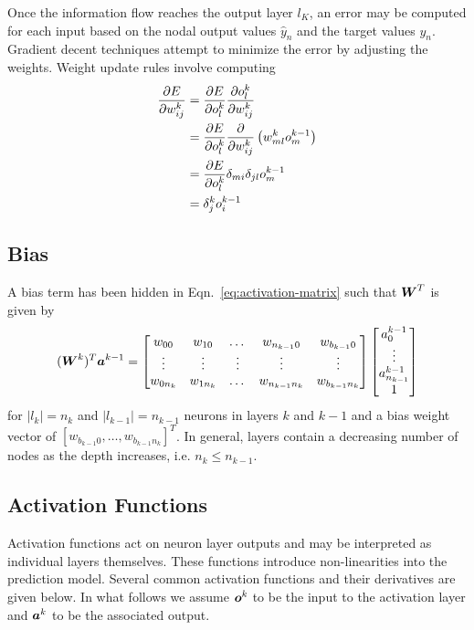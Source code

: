 \documentclass[12pt,notitlepage]{article}
\begin{document}
Once the information flow reaches the output layer $l_{K}$, an error
may be computed for each input based on the nodal output values
$\hat{y}_{n}$ and the target values $y_{n}$.  Gradient decent
techniques attempt to minimize the error by adjusting the weights.
Weight update rules involve computing
\begin{equation}
  \label{eq:error-grad}
  \begin{split}
    \frac{\partial E}{\partial w^{k}_{ij}} &=
    \frac{\partial E}{\partial o_{l}^{k}}\frac{\partial o_{l}^{k}}{\partial w_{ij}^{k}}\\
    &= \frac{\partial E}{\partial o_{l}^{k}} \frac{\partial }{\partial w_{ij}^{k}}\left( w_{ml}^{k}o^{k-1}_{m} \right)\\
    &= \frac{\partial E}{\partial o_{l}^{k}}\delta_{mi}\delta_{jl}o_{m}^{k-1}\\
    &= \delta_{j}^{k}o_{i}^{k-1}
  \end{split}
\end{equation}

\subsection{Bias}
\label{sec:bias}
A bias term has been hidden in Eqn.~\ref{eq:activation-matrix} such
that $\boldsymbol{W}^{T}$ is given by
\begin{equation}
  \label{eq:wmat-explicit}
  (\boldsymbol{W}^{k})^{T}\boldsymbol{a}^{k-1} =
  \begin{bmatrix}
    w_{00} & w_{10} & \dots & w_{n_{k-1}0} & w_{b_{k-1}0} \\
    \vdots & \vdots & \vdots & \vdots & \vdots \\
    w_{0n_{k}} & w_{1n_{k}} & \dots & w_{n_{k-1}n_{k}} & w_{b_{k-1}n_{k}}
  \end{bmatrix}
  \begin{bmatrix}
    a_{0}^{k-1}\\
    \vdots\\
    a_{n_{k-1}}^{k-1}\\
    1
  \end{bmatrix}
\end{equation}
for $|l_{k}|=n_{k}$ and $|l_{k-1}|=n_{k-1}$ neurons in layers $k$ and $k-1$ and a bias
weight vector of $[w_{b_{k-1}0},\dots,w_{b_{k-1}n_{k}}]^{T}$.  In
general, layers contain a decreasing number of nodes as the depth
increases, i.e. $n_{k} \le n_{k-1}$.

\subsection{Activation Functions}
\label{sec:activation-fun}
Activation functions act on neuron layer outputs and may be interpreted as
individual layers themselves.  These functions introduce
non-linearities into the prediction model.  Several common activation
functions and their derivatives are given below.  In what follows we
assume $\boldsymbol{o}^{k}$ to be the input to the activation layer and
$\boldsymbol{a}^{k}$ to be the associated output.
\end{document}
